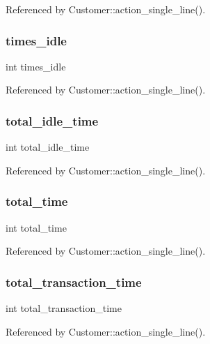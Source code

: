 Referenced by Customer\+::action\+\_\+single\+\_\+line().

\mbox{\label{customer_8cpp_a0a435446c9f9edf46e5f85d076921492}} 
\subsubsection{times\+\_\+idle}
{\footnotesize\ttfamily int times\+\_\+idle}



Referenced by Customer\+::action\+\_\+single\+\_\+line().

\mbox{\label{customer_8cpp_a3f064cc334d929cb4443e24f629a1cf6}} 
\subsubsection{total\+\_\+idle\+\_\+time}
{\footnotesize\ttfamily int total\+\_\+idle\+\_\+time}



Referenced by Customer\+::action\+\_\+single\+\_\+line().

\mbox{\label{customer_8cpp_a6754e1cc6922f32fb9afe8b9badcbe6f}} 
\subsubsection{total\+\_\+time}
{\footnotesize\ttfamily int total\+\_\+time}



Referenced by Customer\+::action\+\_\+single\+\_\+line().

\mbox{\label{customer_8cpp_ae1eb274500513575890cd541b7a24160}} 
\subsubsection{total\+\_\+transaction\+\_\+time}
{\footnotesize\ttfamily int total\+\_\+transaction\+\_\+time}



Referenced by Customer\+::action\+\_\+single\+\_\+line().

